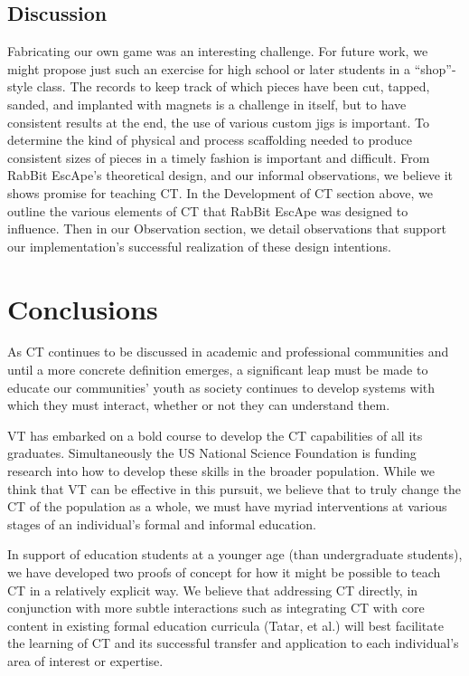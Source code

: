 \documentclass{acm_proc_article-sp}
\begin{document}
\subsection{Discussion}
Fabricating our own game was an interesting challenge. For future work, we might propose just such an exercise for high school or later students in a ``shop''-style class. The records to keep track of which pieces have been cut, tapped, sanded, and implanted with magnets is a challenge in itself, but to have consistent results at the end, the use of various custom jigs is important. To determine the kind of physical and process scaffolding needed to produce consistent sizes of pieces in a timely fashion is important and difficult. 
From RabBit EscApe's theoretical design, and our informal observations, we believe it shows promise for teaching CT. In the Development of CT section above, we outline the various elements of CT that RabBit EscApe was designed to influence. Then in our Observation section, we detail observations that support our implementation's successful realization of these design intentions. 

\section{Conclusions}
As CT continues to be discussed in academic and professional communities and until a more concrete definition emerges, a significant leap must be made to educate our communities' youth as society continues to develop systems with which they must interact, whether or not they can understand them. 

VT has embarked on a bold course to develop the CT capabilities of all its graduates. Simultaneously the US National Science Foundation is funding research into how to develop these skills in the broader population. While we think that VT can be effective in this pursuit, we believe that to truly change the CT of the population as a whole, we must have myriad interventions at various stages of an individual's formal and informal education.

In support of education students at a younger age (than undergraduate students), we have developed two proofs of concept for how it might be possible to teach CT in a relatively explicit way. We believe that addressing CT directly, in conjunction with more subtle interactions such as integrating CT with core content in existing formal education curricula (Tatar, et al.) will best facilitate the learning of CT and its successful transfer and application to each individual's area of interest or expertise.
\end{document}
